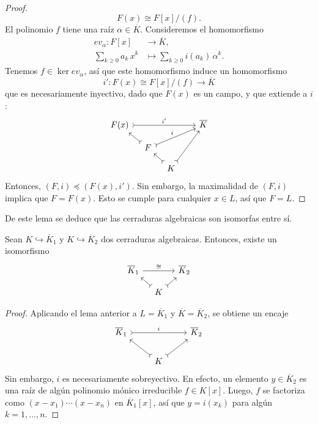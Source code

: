 \begin{proof}
  $$F (x) \cong F [x] / (f).$$
  El polinomio $f$ tiene una raíz $\alpha\in \overline{K}$. Consideremos
  el homomorfismo
  \begin{align*}
    ev_\alpha\colon F [x] & \to \overline{K},\\
    \sum_{k\ge 0} a_k\,x^k & \mapsto \sum_{k\ge 0} i (a_k)\,\alpha^k.
  \end{align*}
  Tenemos $f \in \ker ev_\alpha$, así que este homomorfismo induce un
  homomorfismo
  $$i'\colon F (x) \cong F [x]/(f) \to \overline{K}$$
  que es necesariamente inyectivo, dado que $F (x)$ es un campo, y que extiende a $i$:
  \[ \begin{tikzcd}[row sep=1em, column sep=1em]
    F (x) \ar[>->]{rrrr}{i'} &&&& \overline{K} \\
    & F \ar[>->]{urrr}{i}\ar[>->]{ul} \\
    && K\ar[>->]{ul}\ar[>->]{uurr}
  \end{tikzcd} \]
  Entonces, $(F, i) \preceq (F(x), i')$. Sin embargo, la maximalidad de $(F, i)$
  implica que $F = F (x)$. Esto se cumple para cualquier $x\in L$, así que
  $F = L$.
\end{proof}

De este lema se deduce que las cerraduras algebraicas son isomorfas entre sí.

\begin{teorema}
  Sean $K \hookrightarrow \overline{K}_1$ y $K \hookrightarrow \overline{K}_2$
  dos cerraduras algebraicas. Entonces, existe un isomorfismo
  \[ \begin{tikzcd}[row sep=1em, column sep=1em]
    \overline{K}_1 \ar{rr}{\cong} && \overline{K}_2 \\
    & K\ar[>->]{ul}\ar[>->]{ur}
  \end{tikzcd} \]

  \begin{proof}
    Aplicando el lema anterior a $L = \overline{K}_1$ y
    $\overline{K} = \overline{K}_2$, se obtiene un encaje
    \[ \begin{tikzcd}
      \overline{K}_1 \ar[>->]{rr}{i} && \overline{K}_2 \\
      & K\ar[>->]{ul}\ar[>->]{ur}
    \end{tikzcd} \]
    Sin embargo, $i$ es necesariamente sobreyectivo. En efecto, un elemento
    $y \in \overline{K}_2$ es una raíz de algún polinomio mónico irreducible
    $f\in K [x]$. Luego, $f$ se factoriza como $(x - x_1)\cdots (x - x_n)$ en
    $\overline{K}_1 [x]$, así que $y = i (x_k)$ para algún $k = 1,\ldots,n$.
  \end{proof}
\end{teorema}

